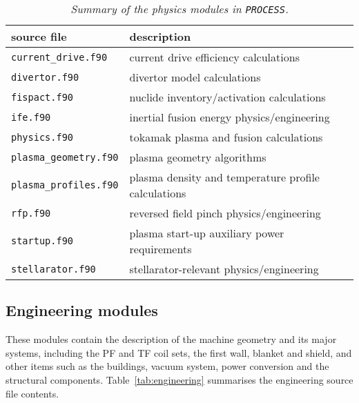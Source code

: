 \documentclass[11pt,a4paper]{report}
\newcommand{\process}{\mbox{\texttt{PROCESS}}}
\begin{document}
\begin{table}[tbph]
\begin{center}

\begin{tabular}{||l||l||} \hline
source file   & description \\ \hline
\texttt{current\_drive.f90} & current drive efficiency calculations \\
\texttt{divertor.f90} & divertor model calculations\\
\texttt{fispact.f90} & nuclide inventory/activation calculations \\
\texttt{ife.f90} & inertial fusion energy physics/engineering \\
\texttt{physics.f90} & tokamak plasma and fusion calculations \\
\texttt{plasma\_geometry.f90} & plasma geometry algorithms \\
\texttt{plasma\_profiles.f90} & plasma density and temperature profile calculations \\
\texttt{rfp.f90} & reversed field pinch physics/engineering \\
\texttt{startup.f90} & plasma start-up auxiliary power requirements \\
\texttt{stellarator.f90 } & stellarator-relevant physics/engineering \\
\hline
\end{tabular}
\end{center}
\caption[Summary of physics modules]
{\label{tab:physics}
  \textit{Summary of the physics modules in \process.}
}
\end{table}

\subsection{Engineering modules}

These modules contain the description of the machine geometry and its major
systems, including the PF and TF coil sets, the first wall, blanket and
shield, and other items such as the buildings, vacuum system, power conversion
and the structural components.  Table~\ref{tab:engineering} summarises the
engineering source file contents.
\end{document}

